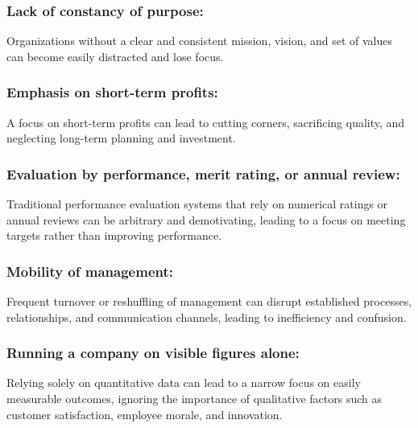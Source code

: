 \documentclass[11pt]{article}
\begin{document}
\hypertarget{lack-of-constancy-of-purpose}{%
\subsubsection{Lack of constancy of
purpose:}\label{lack-of-constancy-of-purpose}}

Organizations without a clear and consistent mission, vision, and set of
values can become easily distracted and lose focus.

\hypertarget{emphasis-on-short-term-profits}{%
\subsubsection{Emphasis on short-term
profits:}\label{emphasis-on-short-term-profits}}

A focus on short-term profits can lead to cutting corners, sacrificing
quality, and neglecting long-term planning and investment.

\hypertarget{evaluation-by-performance-merit-rating-or-annual-review}{%
\subsubsection{Evaluation by performance, merit rating, or annual
review:}\label{evaluation-by-performance-merit-rating-or-annual-review}}

Traditional performance evaluation systems that rely on numerical
ratings or annual reviews can be arbitrary and demotivating, leading to
a focus on meeting targets rather than improving performance.

\hypertarget{mobility-of-management}{%
\subsubsection{Mobility of management:}\label{mobility-of-management}}

Frequent turnover or reshuffling of management can disrupt established
processes, relationships, and communication channels, leading to
inefficiency and confusion.

\hypertarget{running-a-company-on-visible-figures-alone}{%
\subsubsection{Running a company on visible figures
alone:}\label{running-a-company-on-visible-figures-alone}}

Relying solely on quantitative data can lead to a narrow focus on easily
measurable outcomes, ignoring the importance of qualitative factors such
as customer satisfaction, employee morale, and innovation.
\end{document}
